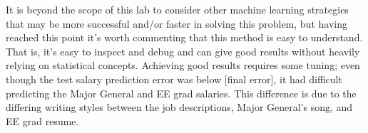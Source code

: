 \documentclass[12pt]{article}
\begin{document}
It is beyond the scope of this lab to consider other machine learning strategies that may be more successful and/or faster in solving this problem, but having reached this point it's worth commenting that this method is easy to understand.
That is, it's easy to inspect and debug and can give good results without heavily relying on statistical concepts.
Achieving good results requires some tuning; even though the test salary prediction error was below [final error], it had difficult predicting the Major General and EE grad salaries.
This difference is due to the differing writing styles between the job descriptions, Major General's song, and EE grad resume.
\end{document}
